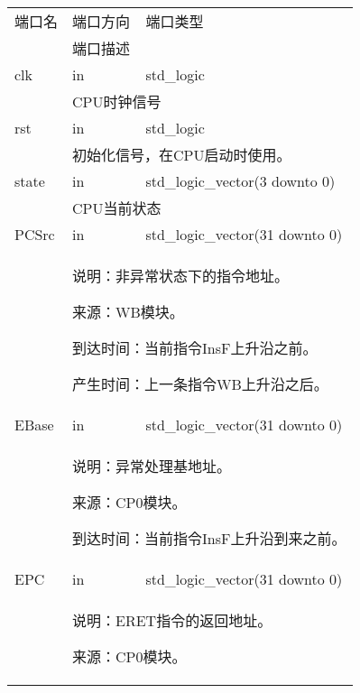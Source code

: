         \begin{tabularx}{\textwidth}{lll}
            \toprule
            端口名          & 端口方向  & 端口类型 \\
            \cmidrule(l){2-3}
            &
            \multicolumn{2}{X}{端口描述} \\
            \midrule
            clk             & in        & std\_logic \\
            \cmidrule(l){2-3}
            &
            \multicolumn{2}{X}{
                CPU时钟信号
            } \\
            \midrule
            rst             & in        & std\_logic \\
            \cmidrule(l){2-3}
            &
            \multicolumn{2}{X}{
                初始化信号，在CPU启动时使用。
            } \\
            \midrule
            state           & in        & std\_logic\_vector(3 downto 0) \\
            \cmidrule(l){2-3}
            &
            \multicolumn{2}{X}{
                CPU当前状态
            } \\
            \midrule
            PCSrc           & in        & std\_logic\_vector(31 downto 0) \\
            \cmidrule(l){2-3}
            &
            \multicolumn{2}{X}{
                说明：非异常状态下的指令地址。

                来源：WB模块。

                到达时间：当前指令InsF上升沿之前。

                产生时间：上一条指令WB上升沿之后。
            } \\
            \midrule
            EBase           & in        & std\_logic\_vector(31 downto 0) \\
            \cmidrule(l){2-3}
            &
            \multicolumn{2}{X}{
                说明：异常处理基地址。

                来源：CP0模块。

                到达时间：当前指令InsF上升沿到来之前。
            } \\
            \midrule
            EPC             & in        & std\_logic\_vector(31 downto 0) \\
            \cmidrule(l){2-3}
            &
            \multicolumn{2}{X}{
                说明：ERET指令的返回地址。

                来源：CP0模块。

}
\end{tabularx}
